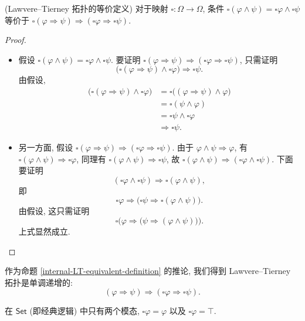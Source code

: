 \begin{prop}
	[label={internal-LT-equivalent-definition}]
	{(Lawvere--Tierney 拓扑的等价定义)}
	对于映射 $\square\colon\Omega\to\Omega$, 条件 $\square(\varphi \land \psi) = \square\varphi\land \square\psi$ 等价于
	$\square(\varphi \Rightarrow \psi) \Rightarrow (\square\varphi \Rightarrow \square\psi)$.%
\end{prop}
\begin{proof}~
	\begin{itemize}
		\item 假设 $\square(\varphi \land \psi) = \square\varphi\land \square\psi$.
		要证明
		$\square(\varphi\Rightarrow\psi)\Rightarrow (\square\varphi \Rightarrow \square\psi)$,
		只需证明
		$$\big(\square(\varphi\Rightarrow\psi)\land \square\varphi\big) \Rightarrow \square\psi.$$
		由假设,
		\begin{align*}
			\big(\square(\varphi\Rightarrow\psi)\land\square\varphi\big) &=
			\square\big(
			(\varphi\Rightarrow\psi)\land \varphi
			\big)
			\\
			&=\square (\psi\land\varphi)\\
			&=\square\psi\land\square\varphi\\
			&\Rightarrow \square\psi.
		\end{align*}
		\item 另一方面, 假设 $\square(\varphi\Rightarrow\psi)\Rightarrow (\square\varphi \Rightarrow \square\psi)$.
		由于 $\varphi\land \psi\Rightarrow \varphi$,
		有 $\square(\varphi \land\psi)\Rightarrow\square\varphi$, 同理有 $\square(\varphi \land\psi)\Rightarrow\square\psi$, 故
		$\square (\varphi\land\psi)\Rightarrow(\square\varphi\land\square\psi)$.
		下面要证明 $$(\square\varphi\land\square\psi)\Rightarrow\square (\varphi\land\psi),$$
		即
		$$\square\varphi\Rightarrow\big(\square\psi\Rightarrow\square (\varphi\land\psi)\big).$$
		由假设, 这只需证明
		$$\square\big(\varphi\Rightarrow\big(\psi\Rightarrow(\varphi\land\psi)\big)\big).$$
		上式显然成立.
	\end{itemize}
\end{proof}

作为命题 \ref{internal-LT-equivalent-definition} 的推论, 我们得到 Lawvere--Tierney 拓扑是单调递增的:
$$
(\varphi\Rightarrow\psi)\Rightarrow (\square\varphi\Rightarrow\square\psi).
$$

\begin{example}
	{}
	在 $\mathsf {Set}$ (即经典逻辑) 中只有两个模态, $\square \varphi = \varphi$ 以及 $\square \varphi = \top$.
\end{example}

